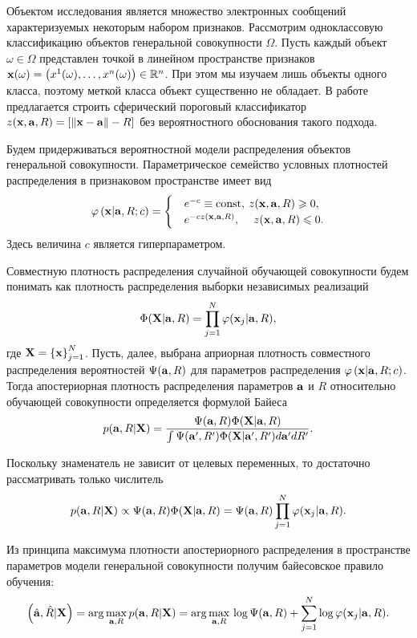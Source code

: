 Объектом исследования является множество электронных сообщений характеризуемых некоторым набором признаков.
Рассмотрим одноклассовую классификацию объектов генеральной совокупности $\Omega$.
Пусть каждый объект $\omega \in{\Omega}$  представлен точкой в линейном пространстве признаков
$\mathbf{x}(\omega)=\left(x^1(\omega),\ldots, x^n(\omega)\right) \in {\mathbb R^n}$. При этом мы изучаем лишь объекты одного класса, поэтому меткой класса объект существенно не обладает. 
В работе \cite{} предлагается строить сферический пороговый классификатор
$z(\mathbf{x},\mathbf{a},R)=\left[\left\|{\mathbf{x}-\mathbf{a}}\right\|-R\right]$ без вероятностного обоснования такого подхода.


Будем придерживаться вероятностной модели распределения объектов генеральной совокупности.
Параметрическое семейство условных плотностей распределения в признаковом пространстве имеет вид 
\begin{equation}
	\label{prob1}
	\varphi \left( {\mathbf{x} | \mathbf{a},R;c} \right) =
		\begin{cases}
			&e^{-c} \equiv \text{const}, \: 	z(\mathbf{x},\mathbf{a},R) \geqslant 0, \\
			&e^{-c z(\mathbf{x},\mathbf{a},R)}, \quad\:	z(\mathbf{x},\mathbf{a},R) \leqslant 0.
		\end{cases} 
\end{equation}
Здесь величина $c$ является гиперпараметром.


Совместную плотность распределения случайной обучающей совокупности будем понимать как плотность распределения выборки независимых реализаций
$$\Phi(\mathbf{X}|\mathbf{a},R)=\prod_{j=1}^N \varphi(\mathbf{x}_j|\mathbf{a},R),$$ 
где $\mathbf{X}=\left\{\mathbf{x}\right\}_{j=1}^N$.
Пусть, далее, выбрана априорная плотность совместного распределения вероятностей $\Psi(\mathbf{a},R)$ для параметров распределения $\varphi \left(\mathbf{x} | \mathbf{a},R;c\right)$. 
Тогда апостериорная плотность распределения параметров $\mathbf{a}$ и $R$ относительно обучающей совокупности определяется формулой Байеса
$$p(\mathbf{a},R|\mathbf{X})
	= \frac {\Psi(\mathbf{a},R) \Phi(\mathbf{X}|\mathbf{a},R)}
			{\int {\Psi(\ensuremath{\mathbf{a}}',R') \Phi(\ensuremath{\mathbf{X}}|\ensuremath{\mathbf{a}}',R')d\ensuremath{\mathbf{a}}'dR'}}.$$

Поскольку знаменатель не зависит от целевых переменных, то достаточно рассматривать только числитель
$$p(\mathbf{a},R|\mathbf{X}) \propto \Psi(\mathbf{a},R) \Phi(\mathbf{X}|\mathbf{a},R) = 
\Psi(\mathbf{a},R) \prod_{j=1}^N \varphi(\mathbf{x}_j|\mathbf{a},R).$$

Из принципа максимума плотности апостериорного распределения в пространстве параметров модели генеральной совокупности получим байесовское правило обучения:
$$\left(\hat{\mathbf{a}},\hat R|\mathbf{X}\right)
	= \arg\underset{\mathbf{a},R}\max\, p(\mathbf{a},R|\mathbf{X}) 
	= \arg\underset{\mathbf{a},R}\max\, \log\Psi(\mathbf{a},R) + \sum_{j=1}^N\log\varphi(\mathbf{x}_j|\mathbf{a},R). $$




